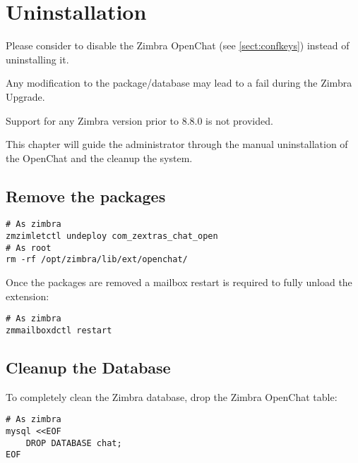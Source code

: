 \chapter{Uninstallation}

\begin{warning}
    Please consider to disable the Zimbra OpenChat (see \autoref{sect:confkeys}) instead of uninstalling it.

    Any modification to the package/database may lead to a fail during the Zimbra Upgrade.

    Support for any Zimbra version prior to 8.8.0 is not provided.
\end{warning}

This chapter will guide the administrator through the manual uninstallation of the OpenChat and
the cleanup the system.

\section{Remove the packages}
    \begin{verbatim}
# As zimbra
zmzimletctl undeploy com_zextras_chat_open
# As root
rm -rf /opt/zimbra/lib/ext/openchat/
    \end{verbatim}

    Once the packages are removed a mailbox restart is required to fully unload the extension:
    \begin{verbatim}
# As zimbra
zmmailboxdctl restart
    \end{verbatim}

\section{Cleanup the Database}
    To completely clean the Zimbra database, drop the Zimbra OpenChat table:
    \begin{verbatim}
# As zimbra
mysql <<EOF
    DROP DATABASE chat;
EOF
    \end{verbatim}
